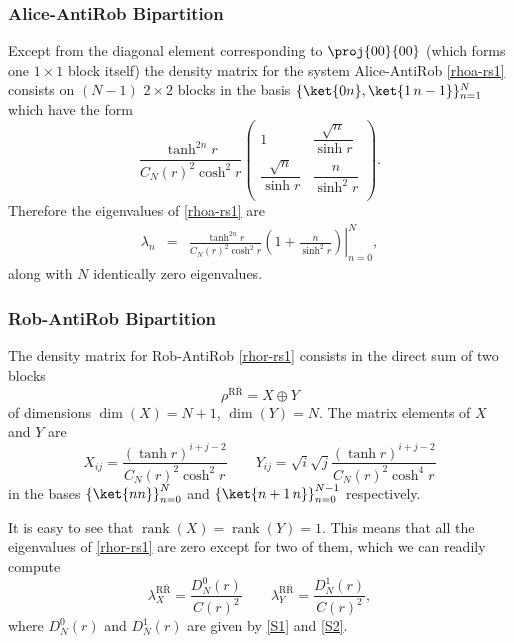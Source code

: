 \subsubsection{Alice-AntiRob Bipartition}

Except from the diagonal element corresponding to $\proj{00}{00}$  (which forms one $1\times1$ block itself) the density matrix for the system Alice-AntiRob \eqref{rhoa-rs1} consists on $(N-1)$ $2\times2$ blocks in the basis $\{\ket{0 n},\ket{1\, n-1}\}_{n=1}^N$ which have the form
\begin{equation}
\frac{\tanh^{2n}r}{C_N(r)^2\cosh^2r}
\left(\!\begin{array}{cc}
1 & \dfrac{\sqrt{n}}{\sinh r} \\
\dfrac{\sqrt{n}}{\sinh r} & \dfrac{n}{\sinh^2 r}\\
\end{array}\!\right).
\end{equation}
Therefore the eigenvalues of \eqref{rhoa-rs1} are
\begin{eqnarray}\label{eigAaR}
\lambda_n&=&\left.\frac{\tanh^{2n}r}{C_N(r)^2\cosh^2r}\left(1+\frac{n}{\sinh^2r}\right)\right|_{n=0}^{N},
\end{eqnarray}
along with $N$ identically zero eigenvalues.


\subsubsection{Rob-AntiRob Bipartition} 


The density matrix for Rob-AntiRob  \eqref{rhor-rs1} consists in the direct sum of two blocks 
\begin{equation}\label{newdoe}
\rho^{\text{R}{\bar{\text{R}}}}=X\oplus Y
\end{equation}
of dimensions $\dim(X)=N+1$, $\dim(Y)=N$.
The matrix elements of $X$ and $Y$ are
\begin{equation}
X_{ij}=\frac{(\tanh r)^{i+j-2}}{C_N(r)^2\cosh^2r }\qquad Y_{ij}=\sqrt{i}\sqrt{j} \frac{(\tanh r)^{i+j-2}}{C_N(r)^2\cosh^4r}
\end{equation}
in the bases $\left\{\ket{nn}\right\}_{n=0}^{N}$ and $\left\{\ket{n+1\,n}\right\}_{n=0}^{N-1}$ respectively.

It is easy to see that $\operatorname{rank}(X)=\operatorname{rank}(Y)=1$. This means that all the eigenvalues of  \eqref{rhor-rs1} are zero  except for two of them, which we can readily compute
\begin{equation}\label{eigRaR}
\lambda^{\text{R}{\bar{\text{R}}}}_{X}=\frac{D_N^0(r)}{C(r)^2}\qquad\lambda^{\text{R}{\bar{\text{R}}}}_{Y}= \frac{D_N^1(r)}{C(r)^2},
\end{equation}
where $D_N^0(r)$ and $D_N^1(r)$ are given by \eqref{S1} and \eqref{S2}.


